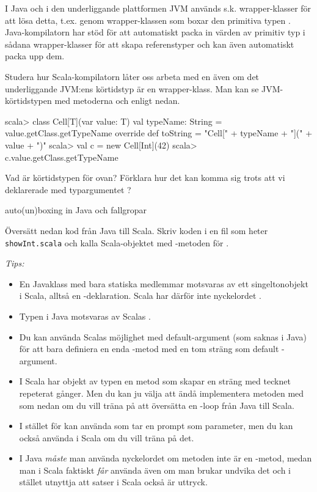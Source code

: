 I Java och i den underliggande plattformen JVM används s.k. wrapper-klasser för att lösa detta, t.ex. genom wrapper-klassen  som boxar den primitiva typen . Java-kompilatorn har stöd för att automatiskt packa in värden av primitiv typ i sådana wrapper-klasser för att skapa referenstyper och kan även automatiskt packa upp dem. 

\Subtask Studera hur Scala-kompilatorn låter oss arbeta med en  även om det underliggande JVM:ens körtidstyp  är en wrapper-klass. Man kan se JVM-körtidstypen med metoderna  och  enligt nedan.
\begin{REPL}
scala> class Cell[T](var value: T){
         val typeName: String = value.getClass.getTypeName
         override def toString = "Cell[" + typeName + "](" + value + ")"
       }
scala> val c = new Cell[Int](42)
scala> c.value.getClass.getTypeName
\end{REPL}


\Subtask Vad är körtidstypen för  ovan? Förklara hur det kan komma sig trots att vi deklarerade med typargumentet ? 


\Subtask \TODO auto(un)boxing in Java och fallgropar

\ExtraTasks %

\Task Översätt nedan kod från Java till Scala. Skriv koden i en fil som heter \texttt{showInt.scala} och kalla Scala-objektet med -metoden för .

\emph{Tips:}
\begin{itemize}[nolistsep, noitemsep]
\item En Javaklass med bara statiska medlemmar motsvaras av ett singeltonobjekt i Scala, alltså en -deklaration. Scala har därför inte nyckelordet .
\item Typen  i Java motsvaras av Scalas .
\item Du kan använda Scalas möjlighet med default-argument (som saknas i Java) för att bara definiera en enda -metod med en tom sträng som default -argument.
\item I Scala har objekt av typen  en metod  som skapar en sträng med tecknet repeterat  gånger. Men du kan ju välja att ändå implementera metoden  med  som nedan om du vill träna på att översätta en -loop från Java till Scala.
\item I stället för  kan använda  som tar en prompt som parameter, men du kan också använda  i Scala om du vill träna på det.
\item I Java \emph{måste} man använda nyckelordet  om metoden inte är en -metod, medan man i Scala faktiskt \emph{får} använda  även om man brukar undvika det och i stället utnyttja att satser i Scala också är uttryck.
\end{itemize}

